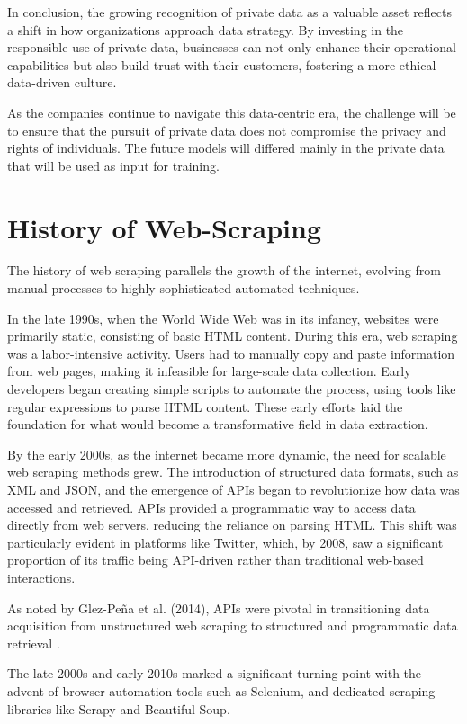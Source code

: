 In conclusion, the growing recognition of private data as a valuable asset reflects a shift in how organizations approach data strategy. By investing in the responsible use of private data, businesses can not only enhance their operational capabilities but also build trust with their customers, fostering a more ethical data-driven culture. 

As the companies continue to navigate this data-centric era, the challenge will be to ensure that the pursuit of private data does not compromise the privacy and rights of individuals. The future models will differed mainly in the private data that will be used as input for training.

\clearpage 

\section{History of Web-Scraping}

The history of web scraping parallels the growth of the internet, evolving from manual processes to highly sophisticated automated techniques. 

In the late 1990s, when the World Wide Web was in its infancy, websites were primarily static, consisting of basic HTML content. During this era, web scraping was a labor-intensive activity. Users had to manually copy and paste information from web pages, making it infeasible for large-scale data collection. Early developers began creating simple scripts to automate the process, using tools like regular expressions to parse HTML content. These early efforts laid the foundation for what would become a transformative field in data extraction.

By the early 2000s, as the internet became more dynamic, the need for scalable web scraping methods grew. The introduction of structured data formats, such as XML and JSON, and the emergence of APIs began to revolutionize how data was accessed and retrieved. APIs provided a programmatic way to access data directly from web servers, reducing the reliance on parsing HTML. This shift was particularly evident in platforms like Twitter, which, by 2008, saw a significant proportion of its traffic being API-driven rather than traditional web-based interactions. 

As noted by Glez-Peña et al. (2014), APIs were pivotal in transitioning data acquisition from unstructured web scraping to structured and programmatic data retrieval \cite{1}.

The late 2000s and early 2010s marked a significant turning point with the advent of browser automation tools such as Selenium, and dedicated scraping libraries like Scrapy and Beautiful Soup. 

